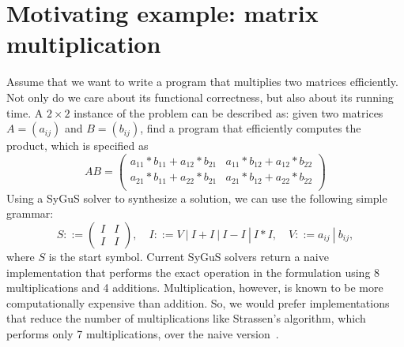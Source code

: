 \section{Motivating example: matrix multiplication}
\label{sec:example}

Assume that we want to write a program that multiplies two matrices efficiently. 
%
Not only do we care about its functional correctness, but also about its running time.
%
A $2 \times 2$ instance of the problem can be described as: given two matrices $A = (a_{ij})$ and $B = (b_{ij})$, find a program that efficiently computes the product, which is specified as
%
\begin{equation}
    AB =
\begin{pmatrix}
a_{11} * b_{11} + a_{12} * b_{21} &
a_{11} * b_{12} + a_{12} * b_{22} \\
a_{21} * b_{11} + a_{22} * b_{21} &
a_{21} * b_{12} + a_{22} * b_{22} \\
\end{pmatrix}
\label{eqn:matrix-mul}
\end{equation}
%
%
Using a SyGuS solver to synthesize a solution, we can use the following simple grammar:
%
\[
S ::=
\begin{pmatrix} I & I \\
I & I
\end{pmatrix}, \quad
I ::= V \ | \ I + I \ | \ I - I \ | \ I * I, \quad
V ::= a_{ij} \ | \ b_{ij},
\]
%
where $S$ is the start symbol.
%
Current SyGuS solvers return a naive implementation that performs the exact operation in the formulation using 8 multiplications and 4 additions.
%
Multiplication, however, is known to be more computationally expensive than addition.
%
So, we would prefer implementations that reduce the number of multiplications like Strassen's algorithm, which performs only 7 multiplications, over the naive version~\cite{strassen:1969}.
%

